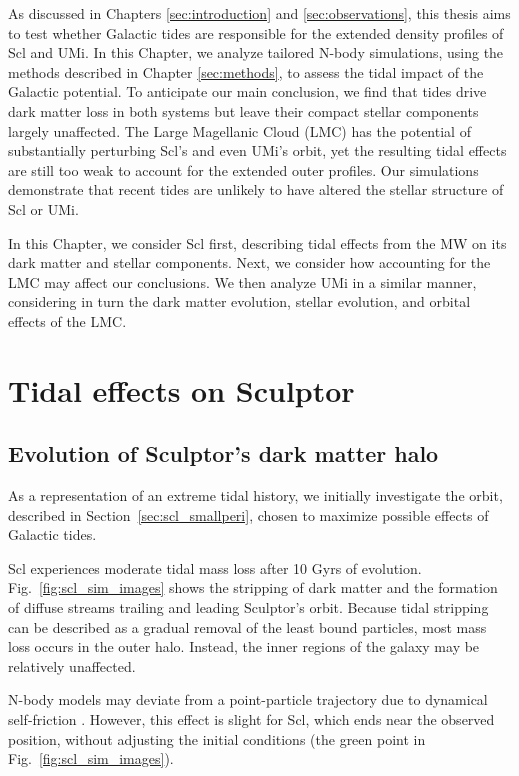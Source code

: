 As discussed in Chapters \ref{sec:introduction} and
\ref{sec:observations}, this thesis aims to test whether Galactic tides
are responsible for the extended density profiles of Scl and UMi. In
this Chapter, we analyze tailored N-body simulations, using the methods
described in Chapter \ref{sec:methods}, to assess the tidal impact of
the Galactic potential. To anticipate our main conclusion, we find that
tides drive dark matter loss in both systems but leave their compact
stellar components largely unaffected. The Large Magellanic Cloud (LMC)
has the potential of substantially perturbing Scl's and even UMi's
orbit, yet the resulting tidal effects are still too weak to account for
the extended outer profiles. Our simulations demonstrate that recent
tides are unlikely to have altered the stellar structure of Scl or UMi.

In this Chapter, we consider Scl first, describing tidal effects from
the MW on its dark matter and stellar components. Next, we consider how
accounting for the LMC may affect our conclusions. We then analyze UMi
in a similar manner, considering in turn the dark matter evolution,
stellar evolution, and orbital effects of the LMC.

\section{Tidal effects on Sculptor}\label{tidal-effects-on-sculptor}

\subsection{Evolution of Sculptor's dark matter
halo}\label{evolution-of-sculptors-dark-matter-halo}

As a representation of an extreme tidal history, we initially
investigate the \smallperi{} orbit, described in
Section~\ref{sec:scl_smallperi}, chosen to maximize possible effects of
Galactic tides.

Scl experiences moderate tidal mass loss after 10 Gyrs of evolution.
Fig.~\ref{fig:scl_sim_images} shows the stripping of dark matter and the
formation of diffuse streams trailing and leading Sculptor's orbit.
Because tidal stripping can be described as a gradual removal of the
least bound particles, most mass loss occurs in the outer halo. Instead,
the inner regions of the galaxy may be relatively unaffected.

N-body models may deviate from a point-particle trajectory due to
dynamical self-friction \citep[e.g.,][]{white1983, miller+2020}.
However, this effect is slight for Scl, which ends near the observed
position, without adjusting the initial conditions (the green point in
Fig.~\ref{fig:scl_sim_images}).

